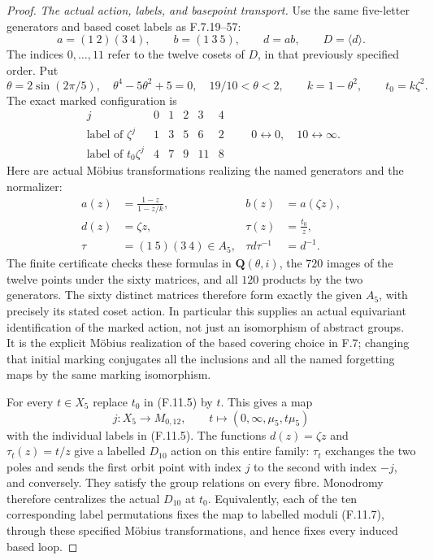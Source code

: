 \begin{proof}
\emph{The actual action, labels, and basepoint transport.}
Use the same five-letter generators and based coset
labels as F.7.19--57:
\[
 a=(1\ 2)(3\ 4),\qquad b=(1\ 3\ 5),\qquad d=ab,\qquad
                       D=\langle d\rangle .
\]
The indices $0,\ldots,11$ refer to the twelve cosets
of $D$, in that previously specified order.  Put
\[
 \theta=2\sin(2\pi/5),\quad
 \theta^4-5\theta^2+5=0,\quad 19/10<\theta<2,\qquad
 k=1-\theta^2,\qquad t_0=k\zeta^2 .
                                                               \tag{F.11.4}
\]
The exact marked configuration is
\[
 \begin{array}{c|ccccc}
 j&0&1&2&3&4\\ \hline
 \text{label of }\zeta^j&1&3&5&6&2\\
 \text{label of }t_0\zeta^j&4&7&9&11&8
 \end{array}
 \qquad 0\longleftrightarrow0,\quad
                      10\longleftrightarrow\infty .           \tag{F.11.5}
\]
Here are actual M\"obius transformations realizing the
named generators and the normalizer:
\[
 \begin{aligned}
 a(z)&=\frac{1-z}{1-z/k},&
 b(z)&=a(\zeta z),\\
 d(z)&=\zeta z,&
 \tau(z)&=\frac{t_0}{z},\\
 \tau&=(1\ 5)(3\ 4)\in A_5,&
 \tau d\tau^{-1}&=d^{-1}.
 \end{aligned}                                                 \tag{F.11.6}
\]
The finite certificate
checks these formulas in
$\mathbf Q(\theta,i)$, the $720$ images of the
twelve points under the sixty matrices, and all
$120$ products by the two generators.  The sixty
distinct matrices therefore form exactly the given
$A_5$, with precisely its stated coset action.
In particular this supplies an actual equivariant
identification of the marked action, not just an
isomorphism of abstract groups.  It is the explicit
M\"obius realization of the based covering choice
in F.7; changing that initial marking conjugates
all the inclusions and all the named forgetting
maps by the same marking isomorphism.

For every $t\in X_5$ replace $t_0$ in (F.11.5) by $t$.
This gives a map
\[
 j:X_5\longrightarrow M_{0,12},\qquad
                   t\longmapsto(0,\infty,\mu_5,t\mu_5)
                                                               \tag{F.11.7}
\]
with the individual labels in (F.11.5).
The functions $d(z)=\zeta z$ and $\tau_t(z)=t/z$
give a labelled $D_{10}$ action on this entire
family: $\tau_t$ exchanges the two poles and
sends the first orbit point with index $j$ to
the second with index $-j$, and conversely.
They satisfy the group relations on every fibre.
Monodromy therefore centralizes the actual
$D_{10}$ at $t_0$.
Equivalently, each of the ten corresponding
label permutations fixes the map to labelled
moduli (F.11.7), through these specified M\"obius
transformations, and hence fixes every induced
based loop.


\end{proof}
